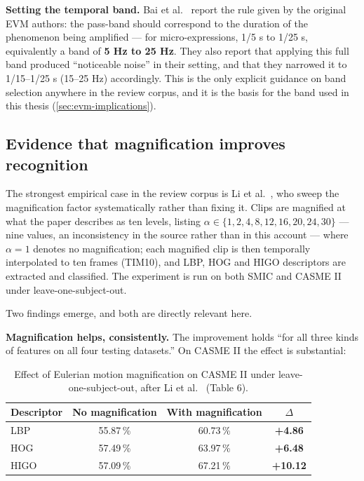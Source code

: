 \textbf{Setting the temporal band.} Bai et al.~\cite{bai2021} report the rule given by the original EVM authors: the pass-band should correspond to the duration of the phenomenon being amplified --- for micro-expressions, 1/5 s to 1/25 s, equivalently a band of \textbf{5 Hz to 25 Hz}. They also report that applying this full band produced ``noticeable noise'' in their setting, and that they narrowed it to 1/15--1/25 s (15--25 Hz) accordingly. This is the only explicit guidance on band selection anywhere in the review corpus, and it is the basis for the band used in this thesis (\autoref{sec:evm-implications}).

\subsection{Evidence that magnification improves recognition}
\label{sec:evm-evidence}

The strongest empirical case in the review corpus is Li et al.~\cite{liX2018}, who sweep the magnification factor systematically rather than fixing it. Clips are magnified at what the paper describes as ten levels, listing $\alpha \in \{1, 2, 4, 8, 12, 16, 20, 24, 30\}$ --- nine values, an inconsistency in the source rather than in this account --- where $\alpha = 1$ denotes no magnification; each magnified clip is then temporally interpolated to ten frames (TIM10), and LBP, HOG and HIGO descriptors are extracted and classified. The experiment is run on both SMIC and CASME II under leave-one-subject-out.

Two findings emerge, and both are directly relevant here.

\textbf{Magnification helps, consistently.} The improvement holds ``for all three kinds of features on all four testing datasets.'' On CASME II the effect is substantial:

\begin{table}[htbp]
	\centering
	\begin{tabular}{l c c c}
		\hline
		\textbf{Descriptor} & \textbf{No magnification} & \textbf{With magnification} & \textbf{$\Delta$} \\
		\hline
		LBP  & 55.87\,\% & 60.73\,\% & \textbf{+4.86} \\
		HOG  & 57.49\,\% & 63.97\,\% & \textbf{+6.48} \\
		HIGO & 57.09\,\% & 67.21\,\% & \textbf{+10.12} \\
		\hline
	\end{tabular}
	\caption[Effect of Eulerian motion magnification on CASME II]{Effect of Eulerian motion magnification on CASME II under leave-one-subject-out, after Li et al.~\cite{liX2018} (Table 6).}
	\label{tab:evm-effect}
\end{table}

